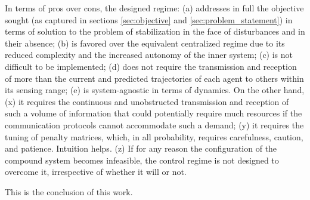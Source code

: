 In terms of pros over cons, the designed regime: (a) addresses in full the
objective sought (as captured in sections \eqref{sec:objective} and
\eqref{sec:problem_statement}) in terms of solution to the problem of
stabilization in the face of disturbances and in their absence; (b) is favored
over the equivalent centralized regime due to its reduced complexity and the
increased autonomy of the inner system; (c) is not difficult to be implemented;
(d) does not require the transmission and reception of more than the current and
predicted trajectories of each agent to others within its sensing range;
(e) is system-agnostic in terms of dynamics.
On the other hand, (x) it requires the continuous and unobstructed transmission
and reception of such a volume of information that could potentially require
much resources if the communication protocols cannot accommodate such a demand;
(y) it requires the tuning of penalty matrices, which, in all probability,
requires carefulness, caution, and patience. Intuition helps. (z) If for any
reason the configuration of the compound system becomes infeasible, the
control regime is not designed to overcome it, irrespective of whether it will
or not.

This is the conclusion of this work.
